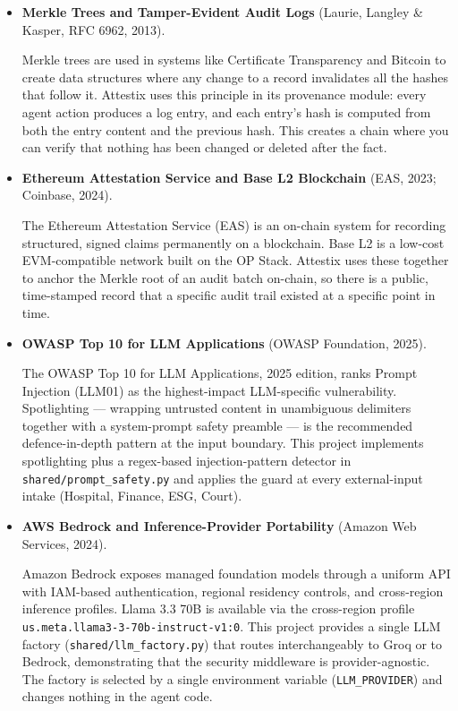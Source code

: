 \begin{itemize}
\item \textbf{Merkle Trees and Tamper-Evident Audit Logs} (Laurie, Langley \& Kasper, RFC 6962, 2013).

Merkle trees are used in systems like Certificate Transparency and Bitcoin to create data structures where any change to a record invalidates all the hashes that follow it. Attestix uses this principle in its provenance module: every agent action produces a log entry, and each entry's hash is computed from both the entry content and the previous hash. This creates a chain where you can verify that nothing has been changed or deleted after the fact.

\item \textbf{Ethereum Attestation Service and Base L2 Blockchain} (EAS, 2023; Coinbase, 2024).

The Ethereum Attestation Service (EAS) is an on-chain system for recording structured, signed claims permanently on a blockchain. Base L2 is a low-cost EVM-compatible network built on the OP Stack. Attestix uses these together to anchor the Merkle root of an audit batch on-chain, so there is a public, time-stamped record that a specific audit trail existed at a specific point in time.

\item \textbf{OWASP Top 10 for LLM Applications} (OWASP Foundation, 2025).

The OWASP Top 10 for LLM Applications, 2025 edition, ranks Prompt Injection (LLM01) as the highest-impact LLM-specific vulnerability. Spotlighting --- wrapping untrusted content in unambiguous delimiters together with a system-prompt safety preamble --- is the recommended defence-in-depth pattern at the input boundary. This project implements spotlighting plus a regex-based injection-pattern detector in \texttt{shared/prompt\_safety.py} and applies the guard at every external-input intake (Hospital, Finance, ESG, Court).

\item \textbf{AWS Bedrock and Inference-Provider Portability} (Amazon Web Services, 2024).

Amazon Bedrock exposes managed foundation models through a uniform API with IAM-based authentication, regional residency controls, and cross-region inference profiles. Llama 3.3 70B is available via the cross-region profile \texttt{us.meta.llama3-3-70b-instruct-v1:0}. This project provides a single LLM factory (\texttt{shared/llm\_factory.py}) that routes interchangeably to Groq or to Bedrock, demonstrating that the security middleware is provider-agnostic. The factory is selected by a single environment variable (\texttt{LLM\_PROVIDER}) and changes nothing in the agent code.


\end{itemize}

